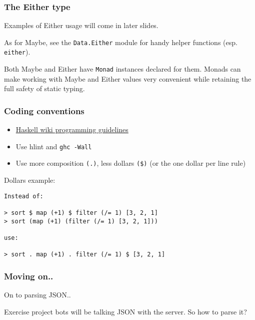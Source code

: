 \documentclass{beamer}
\begin{document}
\begin{frame}[fragile]
\frametitle{The Either type}

Examples of Either usage will come in later slides.
\bigskip

As for Maybe, see the \verb+Data.Either+ module for handy helper
functions (esp. \verb+either+).

\bigskip
Both Maybe and Either have \verb+Monad+ instances declared for them.
Monads can make working with Maybe and Either values very convenient
while retaining the full safety of static typing.

\end{frame}


\begin{frame}[fragile]
\frametitle{Coding conventions}

\begin{itemize}
\item \href{http://www.haskell.org/haskellwiki/Programming_guidelines}{Haskell wiki programming guidelines}
\item Use hlint and \verb+ghc -Wall+
\item Use more composition \verb+(.)+, less dollars \verb+($)+ (or the one dollar
  per line rule)
\end{itemize}

\bigskip

Dollars example:

\begin{verbatim}
Instead of:

> sort $ map (+1) $ filter (/= 1) [3, 2, 1]
> sort (map (+1) (filter (/= 1) [3, 2, 1]))

use:

> sort . map (+1) . filter (/= 1) $ [3, 2, 1]
\end{verbatim}

\end{frame}


\begin{frame}[fragile]
\frametitle{Moving on..}

On to parsing JSON..
\bigskip

Exercise project bots will be talking JSON with the server.  So how to
parse it?

\end{frame}
\end{document}
